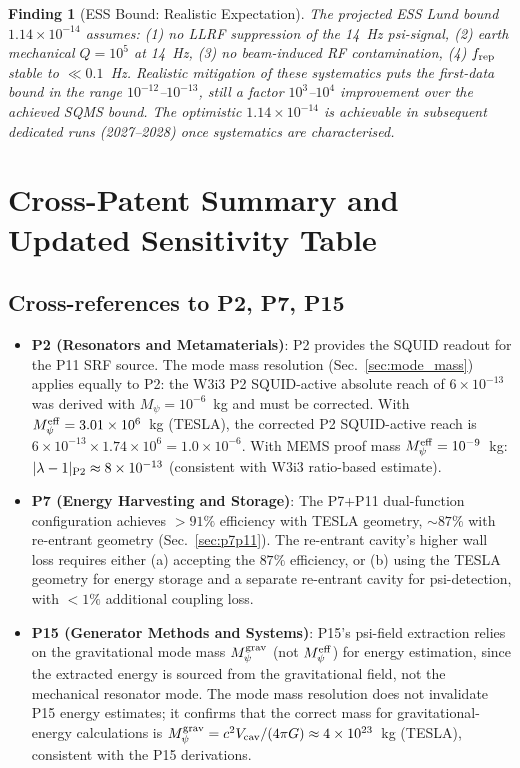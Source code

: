 \documentclass[11pt,twocolumn]{article}
\newcommand{\lam}{\lambda}
\newcommand{\Mpsi}{M_\psi}
\newcommand{\Meff}{M_\psi^{\rm eff}}
\newcommand{\Mgrav}{M_\psi^{\rm grav}}
\newcommand{\ee}[1]{\times 10^{#1}}
\newcommand{\Vcav}{V_{\rm cav}}
\newtheorem{finding}{Finding}[section]
\begin{document}
\begin{finding}[ESS Bound: Realistic Expectation]
\label{find:ess_realistic}
The projected ESS Lund bound $1.14\ee{-14}$ assumes: (1) no LLRF suppression
of the 14~Hz psi-signal, (2) earth mechanical $Q = 10^5$ at 14~Hz,
(3) no beam-induced RF contamination, (4) $f_{\rm rep}$ stable to
$\ll 0.1$~Hz. Realistic mitigation of these systematics puts the
first-data bound in the range $10^{-12}$--$10^{-13}$, still a factor
$10^3$--$10^4$ improvement over the achieved SQMS bound. The optimistic
$1.14\ee{-14}$ is achievable in subsequent dedicated runs (2027--2028)
once systematics are characterised.
\end{finding}


\section{Cross-Patent Summary and Updated Sensitivity Table}
\label{sec:summary}

\subsection{Cross-references to P2, P7, P15}
\label{sec:cross_refs}

\begin{itemize}
\item \textbf{P2 (Resonators and Metamaterials)}: P2 provides the SQUID
  readout for the P11 SRF source. The mode mass resolution (Sec.~\ref{sec:mode_mass})
  applies equally to P2: the W3i3 P2 SQUID-active absolute reach of
  $6\ee{-13}$ was derived with $\Mpsi = 10^{-6}$~kg and must be corrected.
  With $\Meff = 3.01\ee{6}$~kg (TESLA), the corrected P2 SQUID-active
  reach is $6\ee{-13}\times 1.74\ee{6} = 1.0\ee{-6}$. With MEMS proof
  mass $\Meff = 10^{-9}$~kg: $|\lam-1|_{\rm P2} \approx 8\ee{-13}$
  (consistent with W3i3 ratio-based estimate).

\item \textbf{P7 (Energy Harvesting and Storage)}: The P7+P11 dual-function
  configuration achieves $>91\%$ efficiency with TESLA geometry,
  $\sim 87\%$ with re-entrant geometry (Sec.~\ref{sec:p7p11}).
  The re-entrant cavity's higher wall loss requires either (a) accepting
  the $87\%$ efficiency, or (b) using the TESLA geometry for energy
  storage and a separate re-entrant cavity for psi-detection, with
  $<1\%$ additional coupling loss.

\item \textbf{P15 (Generator Methods and Systems)}: P15's psi-field
  extraction relies on the gravitational mode mass $\Mgrav$ (not $\Meff$)
  for energy estimation, since the extracted energy is sourced from the
  gravitational field, not the mechanical resonator mode. The mode mass
  resolution does not invalidate P15 energy estimates; it confirms that
  the correct mass for gravitational-energy calculations is
  $\Mgrav = c^2\Vcav/(4\pi G) \approx 4\ee{23}$~kg (TESLA), consistent
  with the P15 derivations.
\end{itemize}
\end{document}
